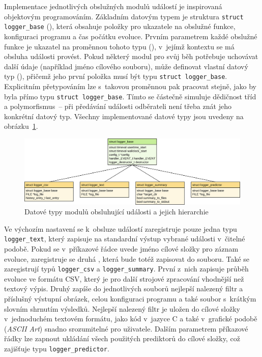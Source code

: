 Implementace jednotlivých obslužných modulů událostí je inspirovaná objektovým programováním. Základním datovým typem je struktura \texttt{struct logger\_base} (), která obsahuje položky pro ukazatele na obslužné funkce, konfiguraci programu a čas počátku evoluce. Prvním parametrem každé obslužné funkce je ukazatel na proměnnou tohoto typu (), v~jejímž kontextu se má obsluha události provést. Pokud některý modul pro svůj běh potřebuje uchovávat další údaje (například jméno cílového souboru), může definovat vlastní datový typ (), přičemž jeho první položka musí být typu \texttt{struct logger\_base}. Explicitním přetypováním lze s~takovou proměnnou pak pracovat stejně, jako by byla přímo typu \texttt{struct logger\_base}. Tímto se částečně simuluje dědičnost tříd a polymorfismus~-- při předávání události odběrateli není třeba znát jeho konkrétní datový typ. Všechny implementované datové typy jsou uvedeny na obrázku~\ref{obrLoggersTypes}.

\begin{figure}[htb]
    \centering
    \includegraphics[width=\textwidth]{fig/loggertypes}
    \caption{Datové typy modulů obsluhující události a jejich hierarchie}
    \label{obrLoggersTypes}
\end{figure}

Ve výchozím nastavení se k~obsluze událostí zaregistruje pouze jedna  typu \texttt{logger\_text}, který zapisuje na standardní výstup vybrané události v~čitelné podobě. Pokud se v~příkazové řádce uvede jméno cílové složky pro záznam evoluce, zaregistruje se druhá , která bude totéž zapisovat do souboru. Také se zaregistrují  typů \texttt{logger\_csv} a \texttt{logger\_summary}. První z~nich zapisuje průběh evoluce ve formátu CSV, který je pro další strojové zpracování vhodnější než textový výpis. Druhý zapíše do jednotlivých souborů nejlepší nalezený filtr a příslušný výstupní obrázek, celou konfiguraci programu a také soubor s~krátkým slovním shrnutím výsledků. Nejlepší nalezený filtr je uložen do cílové složky v~jednoduchém textovém formátu, jako kód v~jazyce C a také v~grafické podobě (\emph{ASCII Art}) snadno srozumitelné pro uživatele. Dalším parametrem příkazové řádky lze zapnout ukládání všech použitých prediktorů do cílové složky, což zajišťuje  typu \texttt{logger\_predictor}.

